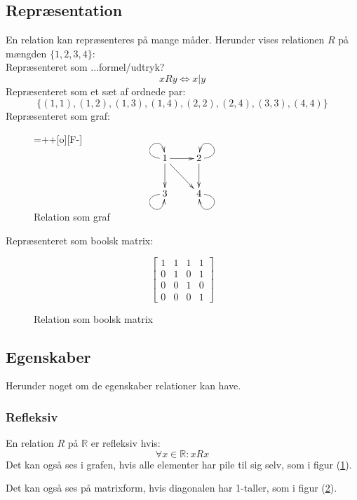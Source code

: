 \documentclass[a4paper]{article}
\begin{document}
\subsection{Repræsentation}
 En relation kan repræsenteres på mange måder. Herunder vises relationen $R$ på mængden $\{ 1,2,3,4 \}$:\\
  Repræsenteret som ...formel/udtryk?
  \begin{equation}
    xRy \iff x | y
  \end{equation}
  Repræsenteret som et sæt af ordnede par:
  \begin{equation}
    \{ (1,1),(1,2),(1,3),(1,4),(2,2),(2,4),(3,3),(4,4) \}
  \end{equation}
  Repræsenteret som graf:
  \begin{figure}[H]
    \entrymodifiers={++[o][F-]}
    $$
    \xymatrix @-0pc {
      1 \ar@(l,u) \ar[r] \ar[d] \ar[dr] & 2 \ar@(r,u) \ar[d] \\
      3 \ar@(l,d) &  4 \ar@(r,d)}
      $$
    \caption{Relation som graf} \label{fig:xy1}
  \end{figure}
  Repræsenteret som boolsk matrix:
  \begin{figure}[H]
    $$
    \begin{bmatrix}
      1 & 1 & 1 & 1 \\
      0 & 1 & 0 & 1 \\
      0 & 0 & 1 & 0 \\
      0 & 0 & 0 & 1
    \end{bmatrix}
    $$
    \caption{Relation som boolsk matrix} \label{fig:bm1}
  \end{figure}
\subsection{Egenskaber}
  Herunder noget om de egenskaber relationer kan have.
  \subsubsection{Refleksiv}
    En relation $R$ på $\mathbb{R}$ er refleksiv hvis:
    \begin{equation}
      \forall x \in \mathbb{R}: xRx
    \end{equation}
    Det kan også ses i grafen, hvis alle elementer har pile til sig selv, som i figur (\ref{fig:xy1}).

    Det kan også ses på matrixform, hvis diagonalen har 1-taller, som i figur (\ref{fig:bm1}).
\end{document}
